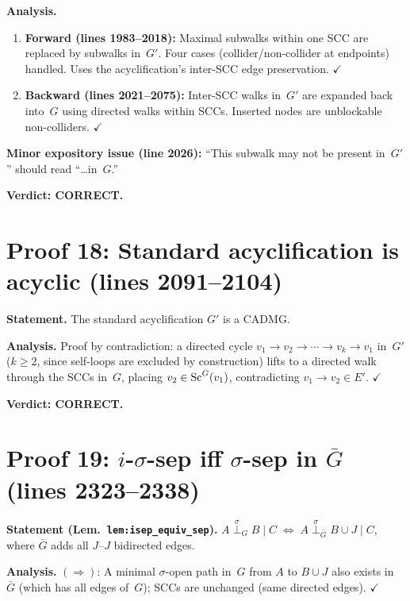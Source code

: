 \documentclass{article}
\begin{document}
\textbf{Analysis.}
\begin{enumerate}[leftmargin=*]
  \item \textbf{Forward (lines 1983--2018):} Maximal subwalks within one SCC are
    replaced by subwalks in~$G'$.  Four cases (collider/non-collider at endpoints)
    handled.  Uses the acyclification's inter-SCC edge preservation.  $\checkmark$
  \item \textbf{Backward (lines 2021--2075):} Inter-SCC walks in~$G'$ are
    expanded back into~$G$ using directed walks within SCCs.
    Inserted nodes are unblockable non-colliders.  $\checkmark$
\end{enumerate}

\textbf{Minor expository issue (line 2026):} ``This subwalk may not be present
in~$G'$'' should read ``\ldots in~$G$.''

\textbf{Verdict: CORRECT.}

\section{Proof 18: Standard acyclification is acyclic (lines 2091--2104)}

\textbf{Statement.} The standard acyclification $G'$ is a CADMG.

\textbf{Analysis.}
Proof by contradiction: a directed cycle
$v_1\to v_2\to\cdots\to v_k\to v_1$ in~$G'$ ($k\ge 2$, since self-loops are
excluded by construction) lifts to a directed walk through the SCCs in~$G$,
placing $v_2\in\mathrm{Sc}^G(v_1)$, contradicting $v_1\to v_2\in E'$.  $\checkmark$

\textbf{Verdict: CORRECT.}

\section{Proof 19: $i$-$\sigma$-sep iff $\sigma$-sep in $\bar G$ (lines 2323--2338)}

\textbf{Statement (Lem.\ \texttt{lem:isep\_equiv\_sep}).}
$A\stackrel{\sigma}{\perp}_G B\mid C \;\iff\;
 A\stackrel{\sigma}{\perp}_{\bar G} B\cup J\mid C$,
where $\bar G$ adds all $J$--$J$ bidirected edges.

\textbf{Analysis.}
$(\Rightarrow)$: A minimal $\sigma$-open path in~$G$ from $A$ to $B\cup J$ also
exists in $\bar G$ (which has all edges of~$G$); SCCs are unchanged (same directed
edges).  $\checkmark$
\end{document}
